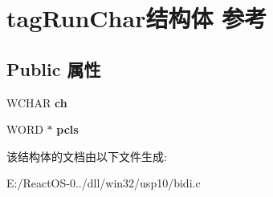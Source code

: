 \hypertarget{structtag_run_char}{}\section{tag\+Run\+Char结构体 参考}
\label{structtag_run_char}
\subsection*{Public 属性}
\begin{DoxyCompactItemize}
\item 
\mbox{\label{structtag_run_char_a777b6d9b319eac1d7bcee18250b0593c}} 
W\+C\+H\+AR {\bfseries ch}
\item 
\mbox{\label{structtag_run_char_a7d565232a678fabc77fe61583c6dd0d0}} 
W\+O\+RD $\ast$ {\bfseries pcls}
\end{DoxyCompactItemize}


该结构体的文档由以下文件生成\+:\begin{DoxyCompactItemize}
\item 
E\+:/\+React\+O\+S-\/0../dll/win32/usp10/bidi.\+c\end{DoxyCompactItemize}
